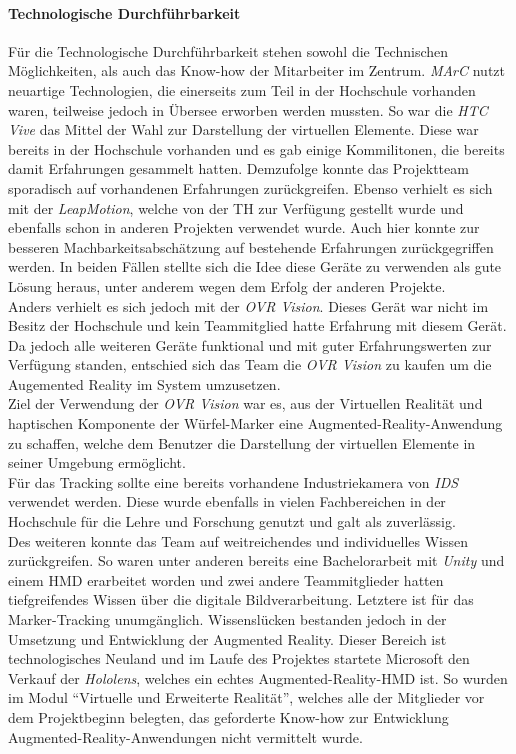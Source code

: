 \paragraph{Technologische Durchführbarkeit} Für die Technologische Durchführbarkeit stehen sowohl die Technischen Möglichkeiten, als auch das Know-how der Mitarbeiter im Zentrum. \textit{MArC} nutzt neuartige Technologien, die einerseits zum Teil in der Hochschule vorhanden waren, teilweise jedoch in Übersee erworben werden mussten. So war die \textit{HTC Vive} das Mittel der Wahl zur Darstellung der virtuellen Elemente. Diese war bereits in der Hochschule vorhanden und es gab einige Kommilitonen, die bereits damit Erfahrungen gesammelt hatten. Demzufolge konnte das Projektteam sporadisch auf vorhandenen Erfahrungen zurückgreifen. Ebenso verhielt es sich mit der \textit{LeapMotion}, welche von der TH zur Verfügung gestellt wurde und ebenfalls schon in anderen Projekten verwendet wurde. Auch hier konnte zur besseren Machbarkeitsabschätzung auf bestehende Erfahrungen zurückgegriffen werden. In beiden Fällen stellte sich die Idee diese Geräte zu verwenden als gute Lösung heraus, unter anderem wegen dem Erfolg der anderen Projekte.\\
Anders verhielt es sich jedoch mit der \textit{OVR Vision}. Dieses Gerät war nicht im Besitz der Hochschule und kein Teammitglied hatte Erfahrung mit diesem Gerät. Da jedoch alle weiteren Geräte funktional und mit guter Erfahrungswerten zur Verfügung standen, entschied sich das Team die \textit{OVR Vision} zu kaufen um die Augemented Reality im System umzusetzen.\\
Ziel der Verwendung der \textit{OVR Vision} war es, aus der Virtuellen Realität und haptischen Komponente der Würfel-Marker eine Augmented-Reality-Anwendung zu schaffen, welche dem Benutzer die Darstellung der virtuellen Elemente in seiner Umgebung ermöglicht.\\
Für das Tracking sollte eine bereits vorhandene Industriekamera von \textit{IDS} verwendet werden. Diese wurde ebenfalls in vielen Fachbereichen in der Hochschule für die Lehre und Forschung genutzt und galt als zuverlässig.\\
Des weiteren konnte das Team auf weitreichendes und individuelles Wissen zurückgreifen. So waren unter anderen bereits eine Bachelorarbeit mit \textit{Unity} und einem HMD erarbeitet worden und zwei andere Teammitglieder hatten tiefgreifendes Wissen über die digitale Bildverarbeitung. Letztere ist für das Marker-Tracking unumgänglich. Wissenslücken bestanden jedoch in der Umsetzung und Entwicklung der Augmented Reality. Dieser Bereich ist technologisches Neuland und im Laufe des Projektes startete Microsoft den Verkauf der \textit{Hololens}, welches ein echtes Augmented-Reality-HMD ist. So wurden im Modul "`Virtuelle und Erweiterte Realität"', welches alle der Mitglieder vor dem Projektbeginn belegten, das geforderte Know-how zur Entwicklung Augmented-Reality-Anwendungen nicht vermittelt wurde.

